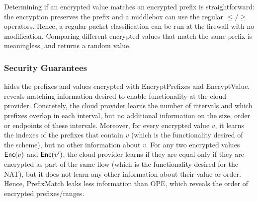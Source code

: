 \begin{framed}
\end{framed}



Determining if an encrypted value matches an encrypted prefix is straightforward: the encryption preserves the prefix and a middlebox can use the regular $\le$/$\ge$ operators.
Hence, a regular packet classification can be run at the firewall with no modification. Comparing different encrypted values that match the same prefix is meaningless, and returns a random value.



\subsubsection{Security Guarantees}
\label{sec:buildingblocks:guarantees}

\pmatch{} hides the  prefixes and values encrypted with EncryptPrefixes and EncryptValue. \pmatch{} reveals  matching information desired to enable functionality at the cloud provider.  Concretely, the cloud provider learns the number of intervals and which prefixes overlap in each interval, but no additional information on the size, order or endpoints of these intervals. Moreover, for every encrypted value $v$, it learns the indexes of the prefixes that contain $v$ (which is the functionality desired of the scheme), but no other information about $v$. For any two encrypted values $\mathsf{Enc}(v)$ and $\mathsf{Enc}(v')$, the cloud provider learns if they are equal only if they are encrypted as part of the same flow (which is the functionality desired for the NAT), but it does not learn any other information about their value or  order.  
Hence, PrefixMatch leaks less information than OPE, which reveals the order of encrypted prefixes/ranges.

